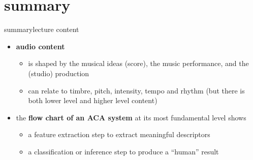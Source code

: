     \section{summary}
        \begin{frame}{summary}{lecture content}
            \begin{itemize}
                \item      \textbf{audio content}
                    \begin{itemize}
                        \item   is shaped by the musical ideas (score), the music performance, and the (studio) production
                        \item   can relate to timbre, pitch, intensity, tempo and rhythm (but there is both lower level and higher level content)
                    \end{itemize}
                \bigskip
                \item   the \textbf{flow chart of an ACA system} at its most fundamental level shows
                    \begin{itemize}
                        \item   a feature extraction step to extract meaningful descriptors
                        \item   a classification or inference step to produce a ``human'' result
                    \end{itemize}
            \end{itemize}
        \end{frame}

